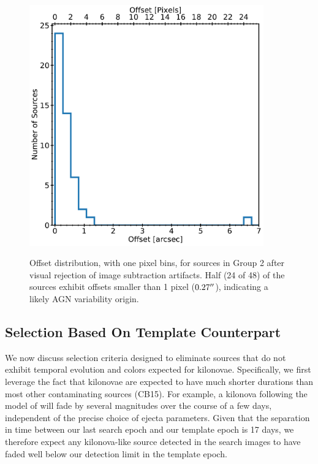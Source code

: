 \begin{figure}[!t]
\begin{center}
\hspace*{-0.1in}
\scalebox{1.}
{\includegraphics[width=0.9\textwidth]{./figs/chapter3/f1.pdf}}
\caption{Offset distribution, with one pixel bins, for sources in Group 2 after visual rejection of image subtraction artifacts. Half (24 of 48) of the sources exhibit offsets smaller than 1 pixel ($0.27\hbox{$^{\prime\prime}$}$), indicating a likely AGN variability origin.}
\label{fig:ch3_offset_hist}
\end{center}
\end{figure}

\subsection{Selection Based On Template Counterpart}
\label{sec:ch3_source_cuts}

We now discuss selection criteria designed to eliminate sources that do not exhibit temporal evolution and colors expected for kilonovae. Specifically, we first leverage the fact that kilonovae are expected to have much shorter durations than most other contaminating sources (CB15). For example, a kilonova following the model of \citealt{BarnesKasen13} will fade by several magnitudes over the course of a few days, independent of the precise choice of ejecta parameters. Given that the separation in time between our last search epoch and our template epoch is 17 days, we therefore expect any kilonova-like source detected in the search images to have faded well below our detection limit in the template epoch.

